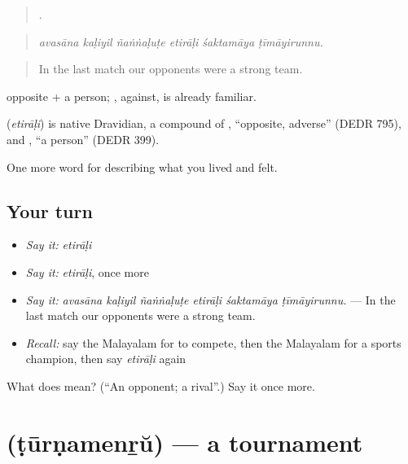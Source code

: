 \begin{quote}
     .
\end{quote}

\begin{quote}
\emph{avasāna kaḷiyil ñaṅṅaḷuṭe etirāḷi śaktamāya ṭīmāyirunnu.}
\end{quote}

\begin{quote}
In the last match our opponents were a strong team.
\end{quote}

 opposite +  a person; , against, is already familiar.

\begin{cousinweb}
\textbf{} (\emph{etirāḷi}) is native Dravidian, a compound of , \textquotedblleft{}opposite, adverse\textquotedblright{} (DEDR 795), and , \textquotedblleft{}a person\textquotedblright{} (DEDR 399).
\end{cousinweb}

\begin{grammarlens}[title={What you've built}]
One more word for describing what you lived and felt.
\end{grammarlens}

\subsection*{Your turn}
\begin{itemize}
\raggedright
  \item \emph{Say it:} \emph{etirāḷi}
  \item \emph{Say it:} \emph{etirāḷi}, once more
  \item \emph{Say it:} \emph{avasāna kaḷiyil ñaṅṅaḷuṭe etirāḷi śaktamāya ṭīmāyirunnu.} — In the last match our opponents were a strong team.
  \item \emph{Recall:} say the Malayalam for to compete, then the Malayalam for a sports champion, then say \emph{etirāḷi} again
\end{itemize}

\begin{tcolorbox}[breakable,colback=teal!4,colframe=teal!35!black,title={Before you move on}]
What does  mean? (\textquotedblleft{}An opponent; a rival\textquotedblright{}.) Say it once more.
\end{tcolorbox}
\section[\texorpdfstring{\ml{ടൂർണമെന്റ്} (ṭūrṇamenṟŭ)}{ടൂർണമെന്റ് (ṭūrṇamenṟŭ)}]{ (ṭūrṇamenṟŭ) — a tournament}

